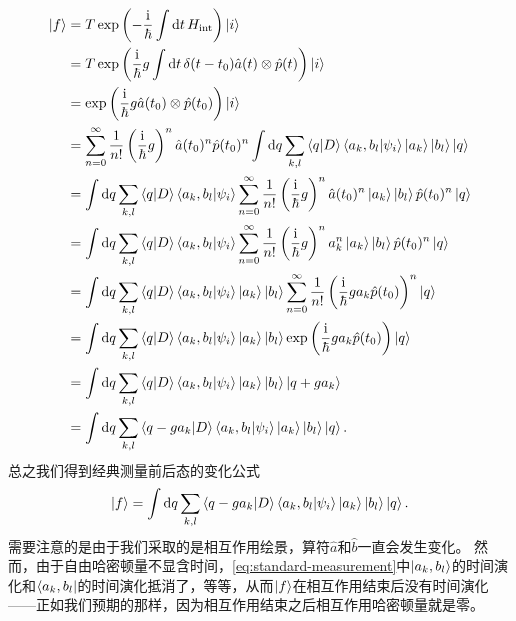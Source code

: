 \documentclass[hyperref, UTF8, a4paper]{ctexart}
\newcommand*{\ii}{\mathrm{i}}
\begin{document}
\[
    \begin{aligned}
        \ket{f} &= T \exp \left( - \frac{\ii}{\hbar} \int \dd{t} H_\text{int} \right) \ket{i} \\
        &= T \exp \left( \frac{\ii}{\hbar} g \int \dd{t} \delta(t-t_0) \hat{a}(t) \otimes \hat{p}(t) \right) \ket{i} \\
        &= \exp \left( \frac{\ii}{\hbar} g \hat{a}(t_0) \otimes \hat{p}(t_0) \right) \ket{i} \\
        &= \sum_{n=0}^\infty \frac{1}{n!} \left(\frac{\ii}{\hbar} g\right)^n \hat{a}(t_0)^n \hat{p}(t_0)^n \int \dd{q} \sum_{k, l} \braket{q}{D} \braket{a_k, b_l}{\psi_i} \ket{a_k} \ket{b_l} \ket{q} \\
        &= \int \dd{q} \sum_{k, l} \braket{q}{D} \braket{a_k, b_l}{\psi_i} \sum_{n=0}^\infty \frac{1}{n!} \left(\frac{\ii}{\hbar} g\right)^n \hat{a}(t_0)^n \ket{a_k} \ket{b_l} \hat{p}(t_0)^n \ket{q} \\
        &= \int \dd{q} \sum_{k, l} \braket{q}{D} \braket{a_k, b_l}{\psi_i} \sum_{n=0}^\infty \frac{1}{n!} \left(\frac{\ii}{\hbar} g\right)^n a_k^n \ket{a_k} \ket{b_l} \hat{p}(t_0)^n \ket{q} \\
        &= \int \dd{q} \sum_{k, l} \braket{q}{D} \braket{a_k, b_l}{\psi_i} \ket{a_k} \ket{b_l} \sum_{n=0}^\infty \frac{1}{n!} \left(\frac{\ii}{\hbar} g a_k \hat{p}(t_0) \right)^n \ket{q} \\
        &= \int \dd{q} \sum_{k, l} \braket{q}{D} \braket{a_k, b_l}{\psi_i} \ket{a_k} \ket{b_l} \exp \left( \frac{\ii}{\hbar} g a_k \hat{p}(t_0) \right) \ket{q} \\
        &= \int \dd{q} \sum_{k, l} \braket{q}{D} \braket{a_k, b_l}{\psi_i} \ket{a_k} \ket{b_l} \ket{q + g a_k} \\
        &= \int \dd{q} \sum_{k, l} \braket{q - g a_k}{D} \braket{a_k, b_l}{\psi_i} \ket{a_k} \ket{b_l} \ket{q} .
    \end{aligned}
\]
总之我们得到经典测量前后态的变化公式
\begin{equation}
    \ket{f} = \int \dd{q} \sum_{k, l} \braket{q - g a_k}{D} \braket{a_k, b_l}{\psi_i} \ket{a_k} \ket{b_l} \ket{q}.
    \label{eq:standard-measurement}
\end{equation}
需要注意的是由于我们采取的是相互作用绘景，算符$\hat{a}$和$\hat{b}$一直会发生变化。
然而，由于自由哈密顿量不显含时间，\eqref{eq:standard-measurement}中$\ket{a_k, b_l}$的时间演化和$\bra{a_k, b_l}$的时间演化抵消了，等等，从而$\ket{f}$在相互作用结束后没有时间演化——正如我们预期的那样，因为相互作用结束之后相互作用哈密顿量就是零。
\end{document}
